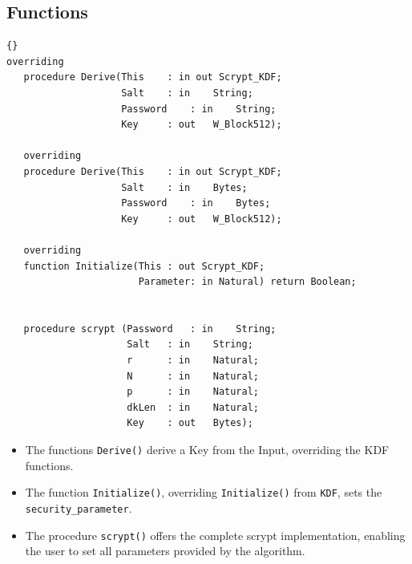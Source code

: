\subsection*{Functions}
\begin{lstlisting}{}
overriding
   procedure Derive(This	: in out Scrypt_KDF;
                    Salt	: in 	String;
                    Password	: in	String;
                    Key		: out	W_Block512);

   overriding
   procedure Derive(This	: in out Scrypt_KDF;
                    Salt	: in 	Bytes;
                    Password	: in	Bytes;
                    Key		: out	W_Block512);

   overriding
   function Initialize(This	: out Scrypt_KDF;
                       Parameter: in Natural) return Boolean;


   procedure scrypt (Password 	: in 	String;
                     Salt 	: in 	String;
                     r		: in 	Natural;
                     N		: in 	Natural;
                     p		: in	Natural;
                     dkLen	: in	Natural;
                     Key	: out 	Bytes);

\end{lstlisting}
\begin{itemize}
	\item The functions \texttt{Derive()} derive a Key from the Input, overriding the KDF functions.
	\item The function \texttt{Initialize()}, overriding \texttt{Initialize()} from \texttt{KDF}, sets the \texttt{security\_parameter}.
	\item The procedure \texttt{scrypt()} offers the complete scrypt implementation, enabling the user to set all parameters provided by the algorithm.
\end{itemize}

